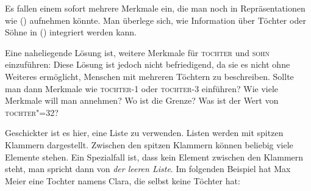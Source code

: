 Es fallen einem sofort mehrere Merkmale ein, die man noch in Repräsentationen wie ()
aufnehmen könnte. Man überlege sich, wie Information über Töchter oder Söhne in 
() integriert werden kann.

Eine naheliegende Lösung ist, weitere Merkmale für \textsc{tochter} und \textsc{sohn}
einzuführen:
\ea
{}
\z
Diese Lösung ist jedoch nicht befriedigend, da sie es nicht ohne Weiteres
ermöglicht, Menschen mit mehreren Töchtern zu beschreiben. Sollte man dann
Merkmale wie \textsc{toch\-ter-1} oder \textsc{tochter-3} einführen?
\ea
{}
\z
Wie viele Merkmale will man annehmen? Wo ist die Grenze?
Was ist der Wert von \textsc{tochter"=32}?

Geschickter ist es hier, eine Liste zu verwenden. Listen werden mit spitzen
Klammern dargestellt. Zwischen den spitzen Klammern können beliebig
viele Elemente stehen. Ein Spezialfall ist, dass kein Element zwischen den
Klammern steht, man spricht dann von \emph{der leeren Liste}. Im folgenden Beispiel
hat Max Meier eine Tochter namens Clara, die selbst keine Töchter hat:
\ea
{}
\z{}

